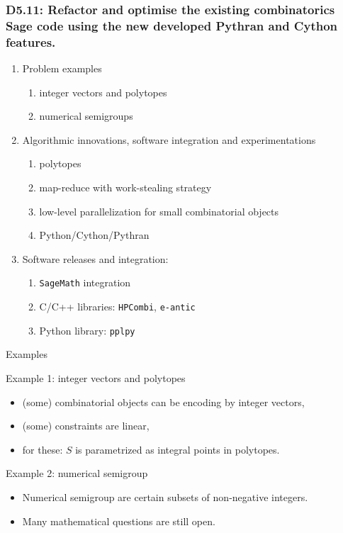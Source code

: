 \documentclass{beamer}
\begin{document}
\begin{frame}
  \frametitle{D5.11: Refactor and optimise the existing combinatorics Sage code using the new developed Pythran and Cython features.}

  \begin{enumerate}
  \item Problem examples
    \begin{enumerate}
    \item integer vectors and polytopes
    \item numerical semigroups
    \end{enumerate}
  \item Algorithmic innovations, software integration and experimentations
    \begin{enumerate}
    \item polytopes
    \item map-reduce with work-stealing strategy
    \item low-level parallelization for small combinatorial objects
    \item Python/Cython/Pythran
    \end{enumerate}
  \item Software releases and integration:
    \begin{enumerate}
    \item \texttt{SageMath} integration
    \item C/C++ libraries: \texttt{HPCombi}, \texttt{e-antic}
    \item Python library: \texttt{pplpy}
    \end{enumerate}
  \end{enumerate}

\end{frame}


\begin{frame}{Examples}
  \begin{block}{Example 1: integer vectors and polytopes}
  \begin{itemize}
  \item (some) combinatorial objects can be encoding by integer vectors,
  \item (some) constraints are linear,
  \item for these: $S$ is parametrized as integral points in polytopes.
  \end{itemize}
  \end{block}

  \begin{block}{Example 2: numerical semigroup}
  \begin{itemize}
  \item Numerical semigroup are certain subsets of non-negative integers.
  \item Many mathematical questions are still open.
  \end{itemize}
  \end{block}
\end{frame}
\end{document}
